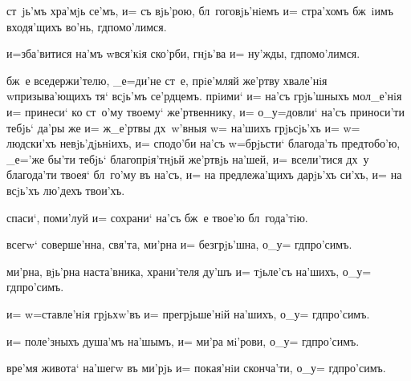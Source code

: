  ст~jь'мъ хра'мjь се'мъ, и= съ вjь'рою, 
бл~гоговjь'нiемъ и= стра'хомъ бж~iимъ входя'щихъ во'нь, 
гд помо'лимся.


 и=зба'витися на'мъ w\т вся'кiя ско'рби, гнjь'ва и= 
ну'жды, гд помо'лимся.



 бж~е вседержи'телю, _е=ди'не ст~е, прiе'мляй 
же'ртву хвале'нiя w\т призыва'ющихъ тя` всjь'мъ 
се'рдцемъ. прiими` и= на'съ грjь'шныхъ мол_е'нiя и= 
принеси` ко ст~о'му твоему` же'ртвеннику, и= о_у=довли` 
на'съ приноси'ти тебjь` да'ры же и= ж_е'ртвы дх~w'вныя w= 
на'шихъ грjьсjь'хъ и= w= людски'хъ невjь'дjьнiихъ, и= 
сподо'би на'съ w=брjьсти` благода'ть пред\ъ тобо'ю, 
_е='же бы'ти тебjь` благопрiя'тнjьй же'ртвjь на'шей, и= 
всели'тися дх~у благода'ти твоея` бл~го'му въ на'съ, и= 
на предлежа'щихъ дарjь'хъ си'хъ, и= на всjь'хъ лю'дехъ 
твои'хъ.

  спаси`, поми'луй и= сохрани` на'съ 
бж~е твое'ю бл~года'тiю.


 всегw` соверше'нна, свя'та, ми'рна и= 
безгрjь'шна, о_у= гд про'симъ.


 ми'рна, вjь'рна наста'вника, храни'теля ду'шъ 
и= тjьле'съ на'шихъ, о_у= гд про'симъ.


 и= w=ставле'нiя грjьхw'въ и= прегрjьше'нiй 
на'шихъ, о_у= гд про'симъ.


 и= поле'зныхъ душа'мъ на'шымъ, и= ми'ра 
мi'рови, о_у= гд про'симъ.


 вре'мя живота` на'шегw въ ми'рjь и= покая'нiи 
сконча'ти, о_у= гд про'симъ.

